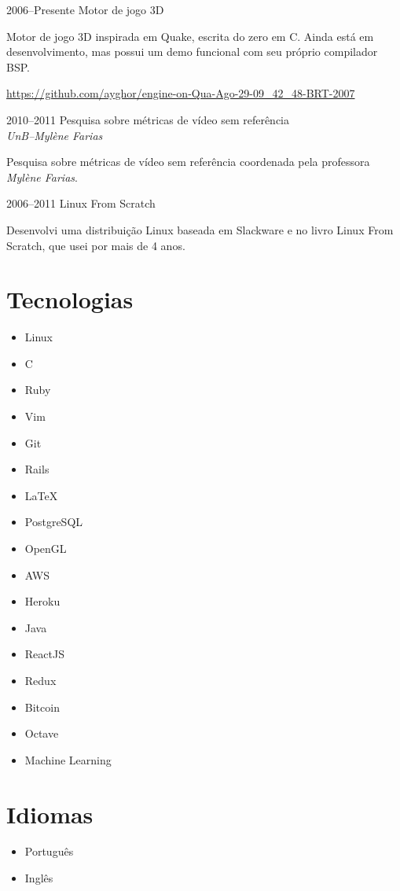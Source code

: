 \documentclass[a4paper,twoside]{simplecv}
\begin{document}
\begin{topic}
\item[2006--Presente] Motor de jogo 3D

	Motor de jogo 3D inspirada em Quake, escrita do zero em C. Ainda está
	em desenvolvimento, mas possui um demo funcional com seu próprio
	compilador BSP.

	{\scriptsize\url{https://github.com/ayghor/engine-on-Qua-Ago-29-09\_42\_48-BRT-2007}}

\item[2010--2011] Pesquisa sobre métricas de vídeo sem referência\\
	{\em\small UnB--Mylène Farias}

	Pesquisa sobre métricas de vídeo sem referência coordenada pela
	professora \emph{Mylène Farias}.

\item[2006--2011] Linux From Scratch

	Desenvolvi uma distribuição Linux baseada em Slackware e no livro Linux
	From Scratch, que usei por mais de 4 anos.
\end{topic}

\section{Tecnologias}

\begin{multicols}{4}
	\raggedcolumns
	\begin{itemize}
		\item Linux
		\item C
		\item Ruby
		\item Vim
		\item Git
		\item Rails
		\item \LaTeX{}
		\item PostgreSQL
		\item OpenGL
		\item AWS
		\item Heroku
		\item Java
		\item ReactJS
		\item Redux
		\item Bitcoin
		\item Octave
		\item Machine Learning
	\end{itemize}
\end{multicols}

\section{Idiomas}

\begin{multicols}{4}
	\raggedcolumns
	\begin{itemize}
		\item Português
		\item Inglês
	\end{itemize}
\end{multicols}

%
\end{document}
